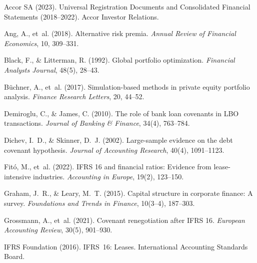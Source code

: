 \documentclass[11pt,a4paper]{article}
\theoremstyle{plain}
\theoremstyle{definition}
\begin{document}
\begin{thebibliography}{99}

Accor SA (2023).
\newblock Universal Registration Documents and Consolidated Financial Statements (2018--2022).
\newblock Accor Investor Relations.

Ang, A., et~al. (2018).
\newblock Alternative risk premia.
\newblock \emph{Annual Review of Financial Economics}, 10, 309--331.

Black, F., \& Litterman, R. (1992).
\newblock Global portfolio optimization.
\newblock \emph{Financial Analysts Journal}, 48(5), 28--43.

B{\"u}chner, A., et~al. (2017).
\newblock Simulation-based methods in private equity portfolio analysis.
\newblock \emph{Finance Research Letters}, 20, 44--52.

Demiroglu, C., \& James, C. (2010).
\newblock The role of bank loan covenants in LBO transactions.
\newblock \emph{Journal of Banking \& Finance}, 34(4), 763--784.

Dichev, I.~D., \& Skinner, D.~J. (2002).
\newblock Large-sample evidence on the debt covenant hypothesis.
\newblock \emph{Journal of Accounting Research}, 40(4), 1091--1123.

Fit{\'o}, M., et~al. (2022).
\newblock IFRS 16 and financial ratios: Evidence from lease-intensive industries.
\newblock \emph{Accounting in Europe}, 19(2), 123--150.

Graham, J.~R., \& Leary, M.~T. (2015).
\newblock Capital structure in corporate finance: A survey.
\newblock \emph{Foundations and Trends in Finance}, 10(3--4), 187--303.

Grossmann, A., et~al. (2021).
\newblock Covenant renegotiation after IFRS 16.
\newblock \emph{European Accounting Review}, 30(5), 901--930.

IFRS Foundation (2016).
\newblock IFRS~16: Leases.
\newblock International Accounting Standards Board.


\end{thebibliography}
\end{document}

